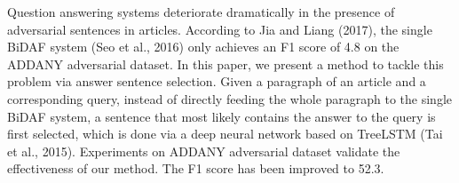Question answering systems deteriorate dramatically in the presence of adversarial sentences in articles. According to Jia and Liang (2017), the single BiDAF system (Seo et al., 2016) only achieves an F1 score of 4.8 on the ADDANY adversarial dataset. In this paper, we present a method to tackle this problem via answer sentence selection. Given a paragraph of an article and a corresponding query, instead of directly feeding the whole paragraph to the single BiDAF system, a sentence that most likely contains the answer to the query is first selected, which is done via a deep neural network based on TreeLSTM (Tai et al., 2015). Experiments on ADDANY adversarial dataset validate the effectiveness of our method. The F1 score has been improved to 52.3.
